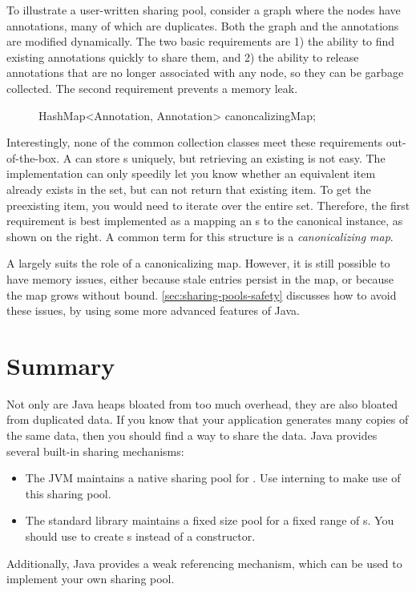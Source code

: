 To illustrate a user-written sharing pool, consider a graph where the nodes
have annotations, many of which are duplicates. Both the graph and the
annotations are modified dynamically. The two basic requirements are 1) the
ability to find existing annotations quickly to share them, and 2) the ability
to release annotations that are no longer associated with any node, so they can
be garbage collected.  The second requirement prevents a memory leak. 

\begin{figure}
\centering
\begin{framedlisting}
HashMap<Annotation, Annotation> canoncalizingMap;
\end{framedlisting}
\end{figure}
Interestingly, none of the common collection classes meet these requirements
out-of-the-box. A  can store s uniquely, but
retrieving an existing  is not easy. The 
implementation can only speedily let you know whether an equivalent item already
exists in the set, but can not return that existing item. To get the preexisting
item, you would need to iterate over the entire set. Therefore, the first
requirement is best implemented as a  mapping an
s to the canonical instance, as shown on the right. A common
term for this structure is a \emph{canonicalizing map}.

A  largely suits the role of a canonicalizing map. However, it is
still possible to have memory issues, either because stale entries persist in
the map, or because the map grows without bound.
\autoref{sec:sharing-pools-safety} discusses how to avoid these issues, by using
some more advanced features of Java.

\section{Summary} 

Not only are Java heaps bloated from too much overhead, they
are also bloated from duplicated data. If you know that your application
generates many copies of the same data, then you should find a way to share the
data. Java provides several built-in sharing mechanisms:

\begin{itemize}
  \item The JVM maintains a native sharing
  pool for . Use  interning to make use of this
  sharing pool.
  \item The standard library maintains a fixed size pool for
   a fixed range of  s. You should use  to create
   s instead of a constructor.
\end{itemize}
Additionally, Java provides a weak referencing mechanism, which can be used to
implement your own sharing pool.

